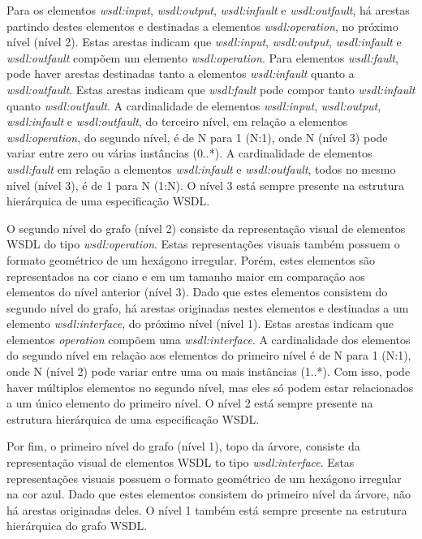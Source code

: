 Para os elementos \textit{wsdl:input}, \textit{wsdl:output}, \textit{wsdl:infault} e \textit{wsdl:outfault}, há arestas partindo destes elementos e destinadas a elementos \textit{wsdl:operation}, no próximo nível (nível 2). Estas arestas indicam que \textit{wsdl:input}, \textit{wsdl:output}, \textit{wsdl:infault} e \textit{wsdl:outfault} compõem um elemento \textit{wsdl:operation}. Para elementos \textit{wsdl:fault}, pode haver arestas destinadas tanto a elementos \textit{wsdl:infault} quanto a \textit{wsdl:outfault}. Estas arestas indicam que \textit{wsdl:fault} pode compor tanto \textit{wsdl:infault} quanto \textit{wsdl:outfault}. A cardinalidade de elementos \textit{wsdl:input}, \textit{wsdl:output}, \textit{wsdl:infault} e \textit{wsdl:outfault}, do terceiro nível, em relação a elementos \textit{wsdl:operation}, do segundo nível, é de N para 1 (N:1), onde N (nível 3) pode variar entre zero ou várias instâncias (0..*). A cardinalidade de elementos \textit{wsdl:fault} em relação a elementos \textit{wsdl:infault} e \textit{wsdl:outfault}, todos no mesmo nível (nível 3), é de 1 para N (1:N). O nível 3 está sempre presente na estrutura hierárquica de uma especificação WSDL.

O segundo nível do grafo (nível 2) consiste da representação visual de elementos WSDL do tipo \textit{wsdl:operation}. Estas representações visuais também possuem o formato geométrico de um hexágono irregular. Porém, estes elementos são representados na cor ciano e em um tamanho maior em comparação aos elementos do nível anterior (nível 3). Dado que estes elementos consistem do segundo nível do grafo, há arestas originadas nestes elementos e destinadas a um elemento \textit{wsdl:interface}, do próximo nível (nível 1). Estas arestas indicam que elementos \textit{operation} compõem uma \textit{wsdl:interface}. A cardinalidade dos elementos do segundo nível em relação aos elementos do primeiro nível é de N para 1 (N:1), onde N (nível 2) pode variar entre uma ou mais instâncias (1..*). Com isso, pode haver múltiplos elementos no segundo nível, mas eles só podem estar relacionados a um único elemento do primeiro nível. O nível 2 está sempre presente na estrutura hierárquica de uma especificação WSDL.

Por fim, o primeiro nível do grafo (nível 1), topo da árvore, consiste da representação visual de elementos WSDL to tipo \textit{wsdl:interface}. Estas representações visuais possuem o formato geométrico de um hexágono irregular na cor azul. Dado que estes elementos consistem do primeiro nível da árvore, não há arestas originadas deles. O nível 1 também está sempre presente na estrutura hierárquica do grafo WSDL.

